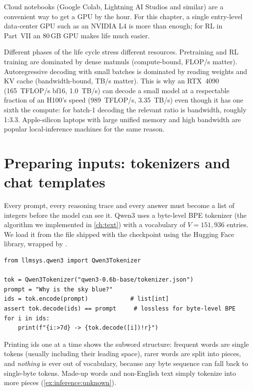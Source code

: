 Cloud notebooks (Google Colab, Lightning AI Studios and similar) are a convenient way to get a
GPU by the hour. For this chapter, a single entry-level data-center GPU such as an NVIDIA L4 is
more than enough; for RL in Part~VII an 80\,GB GPU makes life much easier.

\begin{systemslens}
Different phases of the life cycle stress different resources. Pretraining and RL training are
dominated by dense matmuls (compute-bound, FLOP/s matter). Autoregressive decoding with small
batches is dominated by reading weights and KV cache (bandwidth-bound, TB/s matter). This is why
an RTX~4090 (\SI{165}{TFLOP/s} bf16, \SI{1.0}{TB/s}) can decode a small model at a respectable
fraction of an H100's speed (\SI{989}{TFLOP/s}, \SI{3.35}{TB/s}) even though it has one sixth the
compute: for batch-1 decoding the relevant ratio is bandwidth, roughly 1:3.3. Apple-silicon
laptops with large unified memory and high bandwidth are popular local-inference machines for the
same reason.
\end{systemslens}

\section{Preparing inputs: tokenizers and chat templates}\label{sec:inference:tokenizer}

Every prompt, every reasoning trace and every answer must become a list of integers before
the model can see it. Qwen3 uses a byte-level BPE tokenizer (the algorithm we implemented in
\cref{ch:text}) with a vocabulary of $V=151{,}936$ entries. We load it from the
 file shipped with the checkpoint using the Hugging Face 
library, wrapped by .

\begin{lstlisting}[caption={A tokenizer round trip.},label={lst:inference:roundtrip}]
from llmsys.qwen3 import Qwen3Tokenizer

tok = Qwen3Tokenizer("qwen3-0.6b-base/tokenizer.json")
prompt = "Why is the sky blue?"
ids = tok.encode(prompt)            # list[int]
assert tok.decode(ids) == prompt     # lossless for byte-level BPE
for i in ids:
    print(f"{i:>7d} -> {tok.decode([i])!r}")
\end{lstlisting}

Printing ids one at a time shows the subword structure: frequent words are single tokens (usually
including their leading space), rarer words are split into pieces, and \emph{nothing} is ever out of
vocabulary, because any byte sequence can fall back to single-byte tokens. Made-up words and
non-English text simply tokenize into more pieces (\cref{ex:inference:unknown}).

